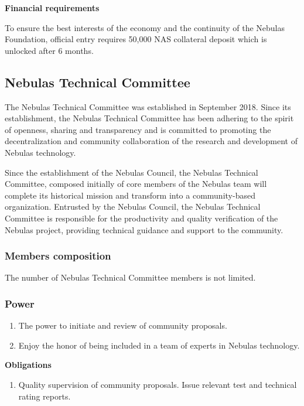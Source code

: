 \vspace{2em}

\textbf{Financial requirements}

To ensure the best interests of the economy and the continuity of the Nebulas Foundation, official entry requires 50,000 NAS collateral deposit which is unlocked after 6 months.

\subsection{Nebulas Technical Committee}

The Nebulas Technical Committee was established in September 2018. Since its establishment, the Nebulas Technical Committee has been adhering to the spirit of openness, sharing and transparency and is committed to promoting the decentralization and community collaboration of the research and development of Nebulas technology. 

Since the establishment of the Nebulas Council, the Nebulas Technical Committee, composed initially of core members of the Nebulas team will complete its historical mission and transform into a community-based organization. Entrusted by the Nebulas Council, the Nebulas Technical Committee is responsible for the productivity and quality verification of the Nebulas project, providing technical guidance and support to the community.

\subsubsection{Members composition}

The number of Nebulas Technical Committee members is not limited.

\subsubsection{Power}

\begin{enumerate}
	\item The power to initiate and review of community proposals.
	\item Enjoy the honor of being included in a team of experts in Nebulas technology.
\end{enumerate}

\textbf{Obligations}

\begin{enumerate}
	\item Quality supervision of community proposals. Issue relevant test and technical rating reports.
\end{enumerate}


